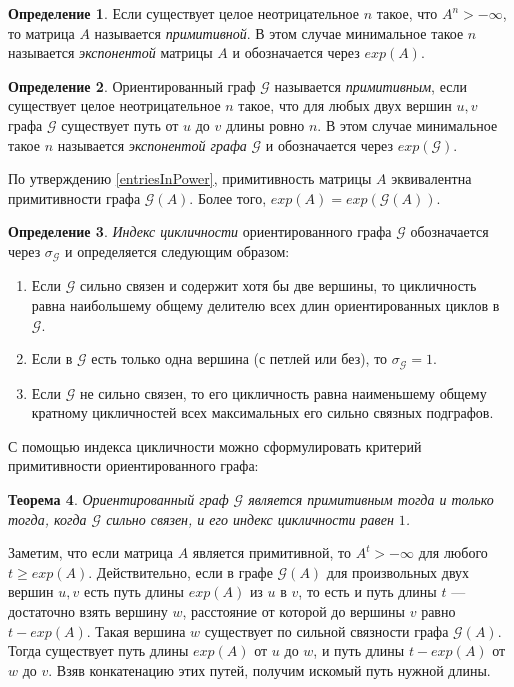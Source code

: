 \documentclass[12pt]{article}
\newtheorem{theorem}{Теорема}[section]
\theoremstyle{definition}
\newtheorem{definition}[theorem]{Определение}
\begin{document}
\begin{definition}
Если существует целое неотрицательное $n$ такое, что $A^n > -\infty$, то матрица $A$ называется \textit{примитивной}. В этом случае минимальное такое $n$ называется \textit{экспонентой} матрицы $A$ и обозначается через $exp(A)$.
\end{definition}

\begin{definition}
Ориентированный граф $\mathcal{G}$ называется \textit{примитивным}, если существует целое неотрицательное $n$ такое, что для любых двух вершин $u, v$ графа $\mathcal{G}$ существует путь от $u$ до $v$ длины ровно $n$. В этом случае минимальное такое $n$ называется \textit{экспонентой графа} $\mathcal{G}$ и обозначается через $exp(\mathcal{G})$.
\end{definition}

По утверждению \ref{entriesInPower}, примитивность матрицы $A$ эквивалентна примитивности графа $\mathcal{G}(A)$. Более того, $exp(A) = exp(\mathcal{G}(A))$.

\begin{definition} \cite[опр. 2.1]{cyclicity}
\textit{Индекс цикличности} ориентированного графа $\mathcal{G}$ обозначается через $\sigma_\mathcal{G}$ и определяется следующим образом:
\begin{enumerate}
    \item Если $\mathcal{G}$ сильно связен и содержит хотя бы две вершины, то цикличность равна наибольшему общему делителю всех длин ориентированных циклов в $\mathcal{G}$.
    \item Если в $\mathcal{G}$ есть только одна вершина (с петлей или без), то $\sigma_\mathcal{G} = 1$.
    \item Если $\mathcal{G}$ не сильно связен, то его цикличность равна наименьшему общему кратному цикличностей всех максимальных его сильно связных подграфов.
\end{enumerate}
\end{definition}

С помощью индекса цикличности можно сформулировать критерий примитивности ориентированного графа:

\begin{theorem}\cite[теорема 3.4.4]{Brualdi}
Ориентированный граф $\mathcal{G}$ является примитивным тогда и только тогда, когда $\mathcal{G}$ сильно связен, и его индекс цикличности равен $1$.
\end{theorem}

Заметим, что если матрица $A$ является примитивной, то $A^t > -\infty$ для любого $t \ge exp(A)$. Действительно, если в графе $\mathcal{G}(A)$ для произвольных двух вершин $u, v$ есть путь длины $exp(A)$ из $u$ в $v$, то есть и путь длины $t$ --- достаточно взять вершину $w$, расстояние от которой до вершины $v$ равно $t - exp(A)$. Такая вершина $w$ существует по сильной связности графа $\mathcal{G}(A)$. Тогда существует путь длины $exp(A)$ от $u$ до $w$, и путь длины $t - exp(A)$ от $w$ до $v$. Взяв конкатенацию этих путей, получим искомый путь нужной длины.
\end{document}
